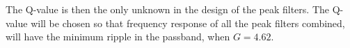 The Q-value is then the only unknown in the design of the peak filters. The Q-value will be chosen so that frequency response of all the peak filters combined, will have the minimum ripple in the passband, when $G = 4.62$.


%
%
%
%
%
%
%
